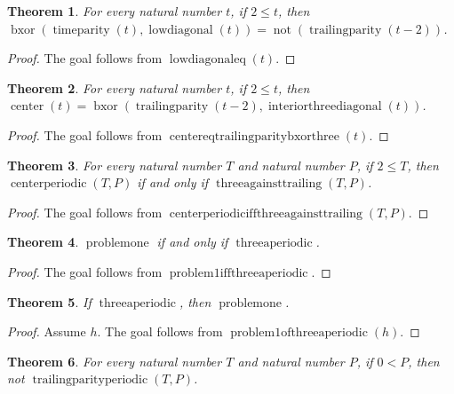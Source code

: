 \documentclass[11pt]{article}
\newtheorem{theorem}{Theorem}[section]
\theoremstyle{definition}
\begin{document}
\begin{theorem}
\label{ll:observations:low-diagonal-eq}
For every natural number \(t\), if \(2 \le t\), then \(\operatorname{bxor}(\operatorname{timeparity}(t), \operatorname{lowdiagonal}(t)) = \operatorname{not}(\operatorname{trailingparity}(t - 2))\).
\end{theorem}
\begin{proof}
The goal follows from \(\operatorname{lowdiagonaleq}(t)\).
\end{proof}
\begin{theorem}
\label{ll:observations:center-eq-trailing-parity-bxor-three}
For every natural number \(t\), if \(2 \le t\), then \(\operatorname{center}(t) = \operatorname{bxor}(\operatorname{trailingparity}(t - 2), \operatorname{interiorthreediagonal}(t))\).
\end{theorem}
\begin{proof}
The goal follows from \(\operatorname{centereqtrailingparitybxorthree}(t)\).
\end{proof}
\begin{theorem}
\label{ll:observations:center-periodic-iff-three-against-trailing}
For every natural number \(T\) and natural number \(P\), if \(2 \le T\), then \(\operatorname{centerperiodic}(T, P)\) if and only if \(\operatorname{threeagainsttrailing}(T, P)\).
\end{theorem}
\begin{proof}
The goal follows from \(\operatorname{centerperiodiciffthreeagainsttrailing}(T, P)\).
\end{proof}
\begin{theorem}
\label{ll:observations:problem1-iff-three-aperiodic}
\(\operatorname{problemone}\) if and only if \(\operatorname{threeaperiodic}\).
\end{theorem}
\begin{proof}
The goal follows from \(\operatorname{problem1iffthreeaperiodic}\).
\end{proof}
\begin{theorem}
\label{ll:observations:problem1-of-three-aperiodic}
If \(\operatorname{threeaperiodic}\), then \(\operatorname{problemone}\).
\end{theorem}
\begin{proof}
Assume \(h\).
The goal follows from \(\operatorname{problem1ofthreeaperiodic}(h)\).
\end{proof}
\begin{theorem}
\label{ll:observations:trailing-parity-not-periodic}
For every natural number \(T\) and natural number \(P\), if \(0 < P\), then not \(\operatorname{trailingparityperiodic}(T, P)\).
\end{theorem}
\end{document}
